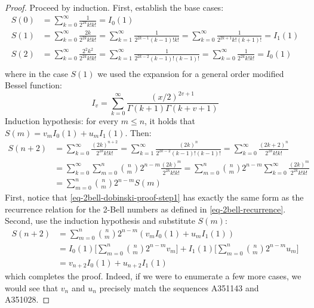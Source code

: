 \documentclass[a4paper]{amsart}
\begin{document}
\begin{proof}
Proceed by induction. First, establish the base cases:
\[
\begin{aligned}
S(0) &= \sum_{k=0}^{\infty} \frac{1}{2^{2k}k!k!} = I_0(1) \\
S(1) &= \sum_{k=0}^{\infty} \frac{2k}{2^{2k}k!k!} = \sum_{k=1}^{\infty} \frac{1}{2^{2k-1}(k-1)!k!} = \sum_{k=0}^{\infty} \frac{1}{2^{2k+1}k!(k+1)!} = I_1(1)\\
S(2) &= \sum_{k=0}^{\infty} \frac{2^2k^2}{2^{2k}k!k!} = \sum_{k=1}^{\infty} \frac{1}{2^{2k-2}(k-1)!(k-1)!} = \sum_{k=0}^{\infty} \frac{1}{2^{2k}k!k!} = I_0(1)\\
\end{aligned}
\]
where in the case $S(1)$ we used the expansion for a general order modified Bessel function:
\[
I_v = \sum_{k=0}^\infty \frac{(x/2)^{2v+1}}{\Gamma(k+1)\Gamma(k+v+1)}
\]
Induction hypothesis: for every $m \leq n$, it holds that $S(m) = v_m I_0(1) + u_m I_1(1)$. Then:
\begin{equation}\label{eq-2bell-dobinski-proof-step1}
\begin{aligned}
S(n+2) &= \sum_{k=0}^{\infty} \frac{(2k)^{n+2}}{2^{2k}k!k!} = \sum_{k=1}^{\infty} \frac{(2k)^{n}}{2^{2k-2}(k-1)!(k-1)!} = \sum_{k=0}^{\infty} \frac{(2k+2)^{n}}{2^{2k}k!k!}\\
&= \sum_{k=0}^{\infty}\sum_{m=0}^{n} \binom{n}{m}2^{n-m}\frac{(2k)^m}{2^{2k}k!k!} = \sum_{m=0}^{n}\binom{n}{m}2^{n-m} \sum_{k=0}^{\infty}\frac{(2k)^m}{2^{2k}k!k!} \\
&= \sum_{m=0}^{n}\binom{n}{m}2^{n-m} S(m)
\end{aligned}
\end{equation}
First, notice that \eqref{eq-2bell-dobinski-proof-step1} has exactly the same form as the recurrence relation for the 2-Bell numbers as defined in \eqref{eq-2bell-recurrence}. Second, use the induction hypothesis and substitute $S(m)$:
\[
\begin{aligned}
S(n+2) &= \sum_{m=0}^{n}\binom{n}{m}2^{n-m} (v_m I_0(1)+u_m I_1(1)) \\
&= I_0(1)\bigg[\sum_{m=0}^{n}\binom{n}{m}2^{n-m}v_m\bigg] + I_1(1)\bigg[\sum_{m=0}^{n}\binom{n}{m}2^{n-m}u_m\bigg] \\
&= v_{n+2}I_0(1)+u_{n+2}I_1(1)
\end{aligned}
\]
which completes the proof. Indeed, if we were to enumerate a few more cases, we would see that $v_n$ and $u_n$ precisely match the sequences A351143 and A351028.


\end{proof}
\end{document}
